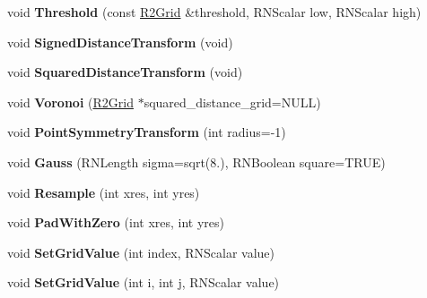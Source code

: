 \begin{DoxyCompactItemize}
\item 
void {\bfseries Threshold} (const \hyperlink{class_r2_grid}{R2\+Grid} \&threshold, R\+N\+Scalar low, R\+N\+Scalar high)\hypertarget{class_r2_grid_a271ede56d0335b775012a9896996790f}{}\label{class_r2_grid_a271ede56d0335b775012a9896996790f}

\item 
void {\bfseries Signed\+Distance\+Transform} (void)\hypertarget{class_r2_grid_aa9b39f779a4d182a77cf32bb2b025b72}{}\label{class_r2_grid_aa9b39f779a4d182a77cf32bb2b025b72}

\item 
void {\bfseries Squared\+Distance\+Transform} (void)\hypertarget{class_r2_grid_a79b7990342f02e6ad2f068dbcf68306a}{}\label{class_r2_grid_a79b7990342f02e6ad2f068dbcf68306a}

\item 
void {\bfseries Voronoi} (\hyperlink{class_r2_grid}{R2\+Grid} $\ast$squared\+\_\+distance\+\_\+grid=N\+U\+LL)\hypertarget{class_r2_grid_ae79769dadc262f29bcdbe3d9330b0d65}{}\label{class_r2_grid_ae79769dadc262f29bcdbe3d9330b0d65}

\item 
void {\bfseries Point\+Symmetry\+Transform} (int radius=-\/1)\hypertarget{class_r2_grid_a361d567562753139f92d1ae5603d1983}{}\label{class_r2_grid_a361d567562753139f92d1ae5603d1983}

\item 
void {\bfseries Gauss} (R\+N\+Length sigma=sqrt(8.), R\+N\+Boolean square=T\+R\+UE)\hypertarget{class_r2_grid_a434b7fb302a2964e02e7ed1f40375eac}{}\label{class_r2_grid_a434b7fb302a2964e02e7ed1f40375eac}

\item 
void {\bfseries Resample} (int xres, int yres)\hypertarget{class_r2_grid_af69f341ffdbf7dae6bf6aab40418339f}{}\label{class_r2_grid_af69f341ffdbf7dae6bf6aab40418339f}

\item 
void {\bfseries Pad\+With\+Zero} (int xres, int yres)\hypertarget{class_r2_grid_ae737c0d12e04d2a968b130722d930f24}{}\label{class_r2_grid_ae737c0d12e04d2a968b130722d930f24}

\item 
void {\bfseries Set\+Grid\+Value} (int index, R\+N\+Scalar value)\hypertarget{class_r2_grid_a40acc54412cf755e2a4127653c7ae387}{}\label{class_r2_grid_a40acc54412cf755e2a4127653c7ae387}

\item 
void {\bfseries Set\+Grid\+Value} (int i, int j, R\+N\+Scalar value)\hypertarget{class_r2_grid_a58ad32806649ee4368566fa8dfdca6e8}{}\label{class_r2_grid_a58ad32806649ee4368566fa8dfdca6e8}


\end{DoxyCompactItemize}
